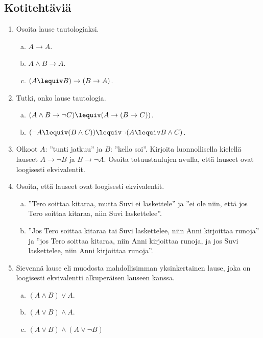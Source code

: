 \subsection*{Kotitehtäviä}

\begin{enumerate}

\item Osoita lause tautologiaksi.
\begin{enumerate}[a)]
\item $A\to A$.
\item $A\land B \to A$.
\item $(A\lequiv B) \to (B\to A)$.

\end{enumerate}

\item Tutki, onko lause tautologia.
\begin{enumerate}[a)]
\item $(A\land B \to \lnot C)\lequiv (A\to(B\to C))$.
\item $(\lnot A \lequiv (B \land C)) \lequiv \lnot (A
\lequiv B \land C)$.
\end{enumerate}

\item Olkoot $A$: ''tunti jatkuu'' ja $B$: ''kello soi''.
Kirjoita luonnollisella kielellä lauseet $A\to \lnot B$
ja $B\to \lnot A$. Osoita totuustaulujen avulla, että
lauseet ovat loogisesti ekvivalentit.

\item Osoita, että lauseet ovat loogisesti ekvivalentit.
\begin{enumerate}[a)]
\item ''Tero soittaa kitaraa, mutta Suvi ei
laskettele'' ja ''ei ole niin, että jos Tero soittaa
kitaraa, niin Suvi laskettelee''.
\item ''Jos Tero soittaa kitaraa tai Suvi laskettelee,
niin Anni kirjoittaa runoja'' ja ''jos Tero soittaa
kitaraa, niin Anni kirjoittaa runoja, ja jos Suvi
laskettelee, niin Anni kirjoittaa runoja''.
\end{enumerate}

\item Sievennä lause eli muodosta mahdollisimman
yksinkertainen lause, joka on loogisesti ekvivalentti
alkuperäisen lauseen kanssa.
\begin{enumerate}[a)]
\item $(A\land B) \lor A$.
\item $(A\lor B) \land A$.
\item $(A\lor B) \land (A\lor \lnot B)$
\end{enumerate}


\end{enumerate}
